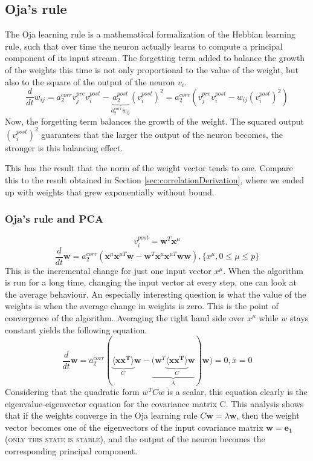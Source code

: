 \documentclass[11pt]{article}
\begin{document}
\subsection{Oja's rule}
The Oja learning rule is a mathematical formalization of the Hebbian learning rule, such that over time the neuron actually learns to compute a principal component of its input stream. The forgetting term added to balance the growth of the weights this time is not only proportional to the value of the weight, but also to the square of the output of the neuron $v_i$.
\[
\frac{d}{dt}w_{ij}=a_2^{corr}v_j^{pre}v_i^{post}-\underbrace{a_2^{post}}_{a_2^{corr}w_{ij}}(v_i^{post})^2=a_2^{corr}(v_j^{pre}v_i^{post}-w_{ij}(v_i^{post})^2)
\]
Now, the forgetting term balances the growth of the weight. The squared output $(v_i^{post})^2$ guarantees that the larger the output of the neuron becomes, the stronger is this balancing effect.

This has the result that the norm of the weight vector tends to one. Compare this to the result obtained in Section \ref{sec:correlationDerivation}, where we ended up with weights that grew exponentially without bound.
\subsubsection{Oja's rule and PCA}
\[
v_i^{post}=\mathbf{w}^T\mathbf{x}^\mu
\]
\[
\frac{d}{dt}\mathbf{w}=a_2^{corr}(\mathbf{x}^\mu \mathbf{x}^{\mu T}\mathbf{w}-\mathbf{w}^T\mathbf{x}^\mu \mathbf{x}^{\mu T}\mathbf{w}\mathbf{w}), \{x^\mu, 0 \leq \mu \leq p\}
\]
This is the incremental change for just one input vector $x^\mu$. When the algorithm is run for a long time, changing the input vector at every step, one can look at the average behaviour. An especially interesting question is what the value of the weights is when the average change in weights is zero. This is the point of convergence of the algorithm. Averaging the right hand side over $x^\mu$ while $w$ stays constant yields the following equation.
\[
\frac{d}{dt}\mathbf{w}=a_2^{corr}(\underbrace{\langle \mathbf{x}\mathbf{x^T} \rangle}_{C} \mathbf{w}-\underbrace{(\mathbf{w}^T\underbrace{\langle \mathbf{x}\mathbf{x^T} \rangle}_{C} \mathbf{w}}_{\lambda})\mathbf{w})=0, \overline{x}=0
\]
Considering that the quadratic form $w^TCw$ is a scalar, this equation clearly is the eigenvalue-eigenvector equation for the covariance matrix C. This analysis shows that if the weights converge in the Oja learning rule $C\mathbf{w}=\lambda\mathbf{w}$, then the weight vector becomes one of the eigenvectors of the input covariance matrix $\mathbf{w}=\mathbf{e_1}$ (\textsc{only this state is stable}), and the output of the neuron becomes the corresponding principal component. 
\end{document}
